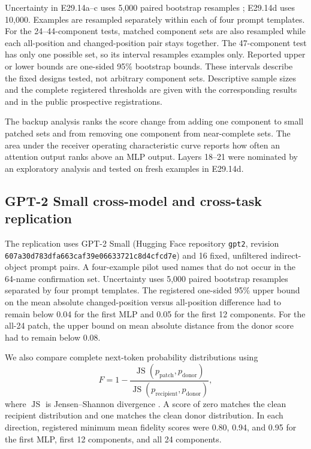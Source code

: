\documentclass[pdflatex,sn-nature]{sn-jnl}
\begin{document}
Uncertainty in E29.14a--c uses 5,000 paired bootstrap resamples
\citep{efron1979bootstrap}; E29.14d uses 10,000. Examples are resampled
separately within each of four prompt
templates. For the 24--44-component tests, matched component sets are also
resampled while each all-position and changed-position pair stays together.
The 47-component test has only one possible set, so its interval resamples
examples only. Reported upper or lower bounds are one-sided 95\% bootstrap
bounds. These intervals describe the fixed designs tested, not arbitrary
component sets. Descriptive sample sizes and the complete registered thresholds
are given with the corresponding results and in the public prospective
registrations.

The backup analysis ranks the score change from adding one component to small
patched sets and from removing one component from near-complete sets. The area
under the receiver operating characteristic curve reports how often an
attention output ranks above an MLP output. Layers 18--21 were nominated by an
exploratory analysis and tested on fresh examples in E29.14d.

\subsection{GPT-2 Small cross-model and cross-task replication}

The replication uses GPT-2 Small (Hugging Face repository \texttt{gpt2},
revision \texttt{607a30d783dfa663caf39e06633721c8d4cfcd7e}) and 16 fixed,
unfiltered indirect-object prompt pairs. A four-example pilot used names that
do not occur in the 64-name confirmation set. Uncertainty uses 5,000 paired
bootstrap resamples separated by four prompt templates. The registered
one-sided 95\% upper bound on the mean absolute changed-position versus
all-position difference had to remain below 0.04 for the first MLP and 0.05
for the first 12 components. For the all-24 patch, the upper bound on mean
absolute distance from the donor score had to remain below 0.08.

We also compare complete next-token probability distributions using
\begin{equation}
F=1-\frac{\operatorname{JS}(p_{\mathrm{patch}},p_{\mathrm{donor}})}
{\operatorname{JS}(p_{\mathrm{recipient}},p_{\mathrm{donor}})},
\label{eq:js}
\end{equation}
where $\operatorname{JS}$ is Jensen--Shannon divergence
\citep{lin1991divergence}. A score of zero
matches the clean recipient distribution and one matches the clean donor
distribution. In each direction, registered minimum mean fidelity scores were
0.80, 0.94,
and 0.95 for the first MLP, first 12 components, and all 24 components.
\end{document}

